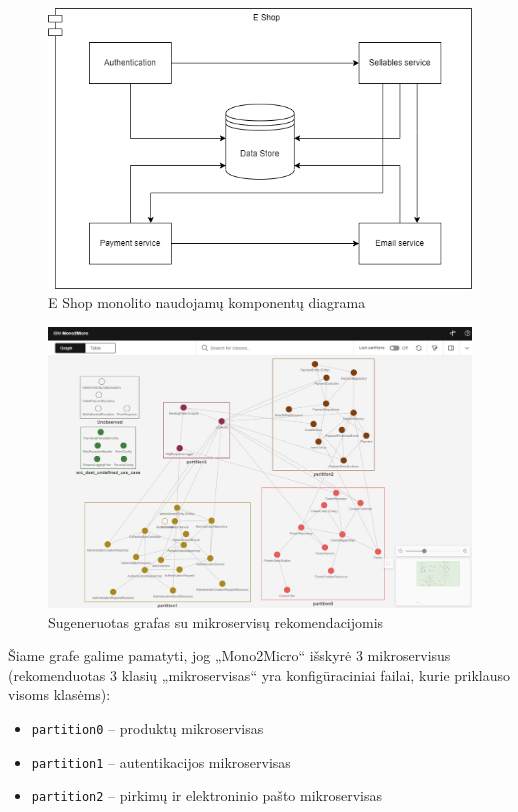 \documentclass{VUMIFPSbakalaurinis}
\begin{document}
\begin{figure}[H]
    \centering
    \includegraphics[scale=0.6]{img/komponentu diagrama.drawio.png}
    \caption{E Shop monolito naudojamų komponentų diagrama}
    \label{img:e-shop-komponentai}
\end{figure}


\begin{figure}[H]
    \centering
    \includegraphics[scale=0.4]{img/grafas.png}
    \caption{Sugeneruotas grafas su mikroservisų rekomendacijomis}
    \label{img:grafas}
\end{figure}

Šiame grafe galime pamatyti, jog „Mono2Micro“ išskyrė 3 mikroservisus (rekomenduotas 3 klasių „mikroservisas“ yra konfigūraciniai failai, kurie priklauso visoms klasėms):
\begin{itemize}
    \item \verb|partition0| -- produktų mikroservisas

    \item \verb|partition1| -- autentikacijos mikroservisas

    \item \verb|partition2| -- pirkimų ir elektroninio pašto mikroservisas
\end{itemize}
\end{document}
